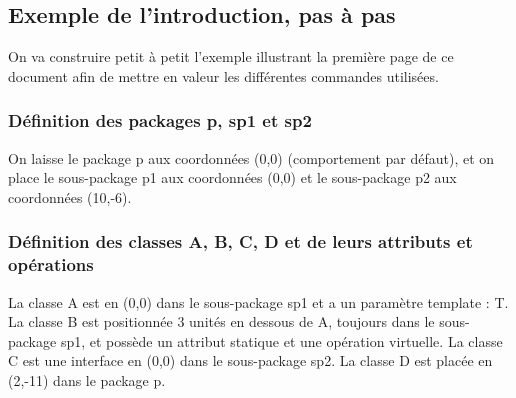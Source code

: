\documentclass[a4paper,11pt]{article}
\begin{document}
\subsection{Exemple de l'introduction, pas à pas}

On va construire petit à petit l'exemple illustrant la première page de ce document afin de mettre en valeur les différentes commandes utilisées.

\subsubsection{Définition des packages p, sp1 et sp2}

On laisse le package p aux coordonnées (0,0) (comportement par défaut), et on place le sous-package p1 aux coordonnées (0,0) et le sous-package p2 aux coordonnées (10,-6).

{\color{red!70!black}
\vspace{-0.4cm}
\vspace{-0.4cm}
\vspace{-0.4cm}

}

\begin{center}
\end{center}

\subsubsection{Définition des classes A, B, C, D et de leurs attributs et opérations}

La classe A est en (0,0) dans le sous-package sp1 et a un paramètre template : T. La classe B est positionnée 3 unités en dessous de A, toujours dans le sous-package sp1, et  possède un attribut statique et une opération virtuelle. La classe C est une interface en (0,0) dans le sous-package sp2. La classe D est placée en (2,-11) dans le package p.
\end{document}
